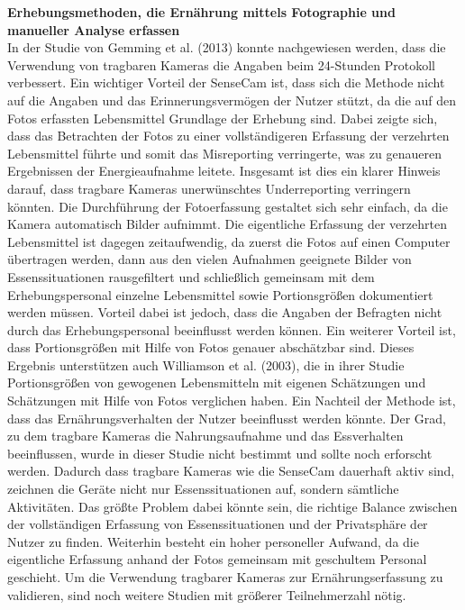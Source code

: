 \textbf{Erhebungsmethoden, die Ernährung mittels Fotographie und manueller Analyse erfassen}\\
In der Studie von Gemming et al. (2013) konnte nachgewiesen werden, dass die Verwendung von tragbaren Kameras die Angaben beim 24-Stunden Protokoll verbessert. Ein wichtiger Vorteil der SenseCam ist, dass sich die Methode nicht auf die Angaben und das Erinnerungsvermögen der Nutzer stützt, da die auf den Fotos erfassten Lebensmittel Grundlage der Erhebung sind. Dabei zeigte sich, dass das Betrachten der Fotos zu einer vollständigeren Erfassung der verzehrten Lebensmittel führte und somit das Misreporting verringerte, was zu genaueren Ergebnissen der Energieaufnahme leitete. Insgesamt ist dies ein klarer Hinweis darauf, dass tragbare Kameras unerwünschtes Underreporting verringern könnten. Die Durchführung der Fotoerfassung gestaltet sich sehr einfach, da die Kamera automatisch Bilder aufnimmt. Die eigentliche Erfassung der verzehrten Lebensmittel ist dagegen zeitaufwendig, da zuerst die Fotos auf einen Computer übertragen werden, dann aus den vielen Aufnahmen geeignete Bilder von Essenssituationen rausgefiltert und schließlich gemeinsam mit dem Erhebungspersonal einzelne Lebensmittel sowie Portionsgrößen dokumentiert werden müssen. Vorteil dabei ist jedoch, dass die Angaben der Befragten nicht durch das Erhebungspersonal beeinflusst werden können. Ein weiterer Vorteil ist, dass Portionsgrößen mit Hilfe von Fotos genauer abschätzbar sind. Dieses Ergebnis unterstützen auch Williamson et al. (2003), die in ihrer Studie Portionsgrößen von gewogenen Lebensmitteln mit eigenen Schätzungen und Schätzungen mit Hilfe von Fotos verglichen haben. Ein Nachteil der Methode ist, dass das Ernährungsverhalten der Nutzer beeinflusst werden könnte. Der Grad, zu dem tragbare Kameras die Nahrungsaufnahme und das Essverhalten beeinflussen, wurde in dieser Studie nicht bestimmt und sollte noch erforscht werden. Dadurch dass tragbare Kameras wie die SenseCam dauerhaft aktiv sind, zeichnen die Geräte nicht nur Essenssituationen auf, sondern sämtliche Aktivitäten. Das größte Problem dabei könnte sein, die richtige Balance zwischen der vollständigen Erfassung von Essenssituationen und der Privatsphäre der Nutzer zu finden. Weiterhin besteht ein hoher personeller Aufwand, da die eigentliche Erfassung anhand der Fotos gemeinsam mit geschultem Personal geschieht. Um die Verwendung tragbarer Kameras zur  Ernährungserfassung zu validieren, sind noch weitere Studien mit größerer Teilnehmerzahl nötig. \\
